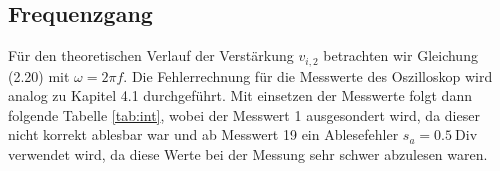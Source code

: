 \subsection*{Frequenzgang}
Für den theoretischen Verlauf der Verstärkung $v_{i,2}$ betrachten wir Gleichung (2.20) mit $\omega = 2\pi f$.
Die Fehlerrechnung für die Messwerte des Oszilloskop wird analog zu Kapitel 4.1 durchgeführt.  
Mit einsetzen der Messwerte folgt dann folgende Tabelle \ref{tab:int}, wobei der Messwert 1 ausgesondert wird, da dieser nicht korrekt ablesbar war und ab Messwert 19 ein Ablesefehler $s_a = 0.5~\text{Div}$ verwendet wird, da diese Werte bei der Messung sehr schwer abzulesen waren.
